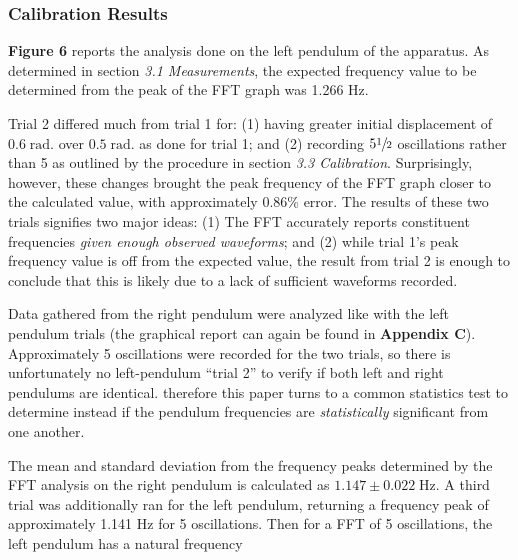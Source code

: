 \documentclass[12pt]{article}
\newcommand{\Hz}{\;\mathrm{Hz}}
\newcommand{\radian}{\;\mathrm{rad.}}
\begin{document}
\begin{multicols}{2}
\subsubsection{Calibration Results}
\textbf{Figure 6} reports the analysis done on the left pendulum of the apparatus.
As determined in section \textit{3.1 Measurements}, the expected frequency value to be determined from the peak of the FFT graph was 1.266 Hz.

Trial 2 differed much from trial 1 for:
(1) having greater initial displacement of $0.6\radian$ over $0.5\radian$ as done for trial 1;
and (2) recording $5\sfrac{1}{2}$ oscillations rather than 5 as outlined by the procedure in section \textit{3.3 Calibration}.
Surprisingly, however, these changes brought the peak frequency of the FFT graph closer to the calculated value, with approximately $0.86\%$ error.
The results of these two trials signifies two major ideas:
(1) The FFT accurately reports constituent frequencies \textit{given enough observed waveforms};
and (2) while trial 1's peak frequency value is off from the expected value,
the result from trial 2 is enough to conclude that this is likely due to a lack of sufficient waveforms recorded.

Data gathered from the right pendulum were analyzed like with the left pendulum trials (the graphical report can again be found in \textbf{Appendix C}).
Approximately 5 oscillations were recorded for the two trials, so there is unfortunately no left-pendulum ``trial 2'' to verify if both left and right pendulums are identical.
therefore this paper turns to a common statistics test to determine instead if the pendulum frequencies are \textit{statistically} significant from one another.

The mean and standard deviation from the frequency peaks determined by the FFT analysis on the right pendulum is calculated as $1.147\pm0.022\Hz$.
A third trial was additionally ran for the left pendulum, returning a frequency peak of approximately 1.141 Hz for 5 oscillations.
Then for a FFT of 5 oscillations, the left pendulum has a natural frequency
\end{multicols}
\newpage
\end{document}
